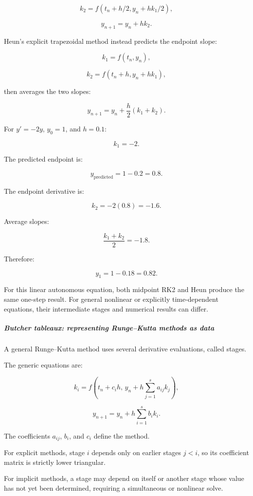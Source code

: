 \[
k_2=f(t_n+h/2,y_n+hk_1/2),
\]

\[
y_{n+1}=y_n+hk_2.
\]

Heun's explicit trapezoidal method instead predicts the endpoint slope:

\[
k_1=f(t_n,y_n),
\]

\[
k_2=f(t_n+h,y_n+hk_1),
\]

then averages the two slopes:

\[
\boxed{ y_{n+1} = y_n+\frac h2(k_1+k_2) }.
\]

For \(y'=-2y\), \(y_0=1\), and \(h=0.1\):

\[
k_1=-2.
\]

The predicted endpoint is:

\[
y_{\mathrm{predicted}}=1-0.2=0.8.
\]

The endpoint derivative is:

\[
k_2=-2(0.8)=-1.6.
\]

Average slopes:

\[
\frac{k_1+k_2}{2}=-1.8.
\]

Therefore:

\[
y_1=1-0.18=\boxed{0.82}.
\]

For this linear autonomous equation, both midpoint RK2 and Heun produce the same one-step result. For general nonlinear or explicitly time-dependent equations, their intermediate stages and numerical results can differ.

\subparagraph{Butcher tableaux: representing Runge--Kutta methods as data}\label{02-foundations-ii-ch025-butcher-tableaux-representing-rungekutta-methods-as-data}

\hypertarget{02-foundations-ii-ch025-butcher-tableaux-representing-rungekutta-methods-as-data}{}

A general Runge--Kutta method uses several derivative evaluations, called stages.

The generic equations are:

\[
k_i= f\left( t_n+c_ih,\, y_n+h\sum_{j=1}^{s}a_{ij}k_j \right),
\]

\[
\boxed{ y_{n+1} = y_n+h\sum_{i=1}^{s}b_ik_i }.
\]

The coefficients \(a_{ij}\), \(b_i\), and \(c_i\) define the method.

For explicit methods, stage \(i\) depends only on earlier stages \(j<i\), so its coefficient matrix is strictly lower triangular.

For implicit methods, a stage may depend on itself or another stage whose value has not yet been determined, requiring a simultaneous or nonlinear solve.

